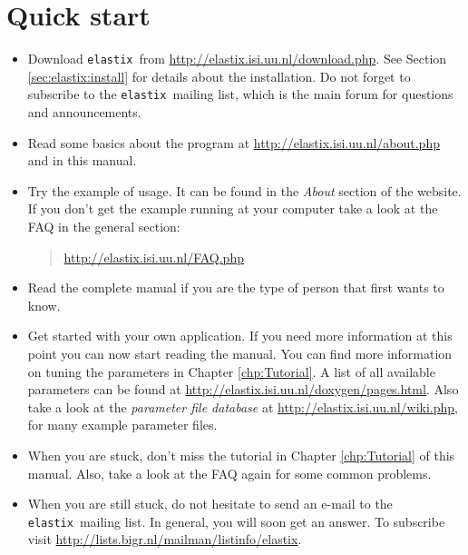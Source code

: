 \documentclass[]{report}
\newcommand{\elastix}{\texttt{elastix}}
\begin{document}

\section{Quick start}

\begin{itemize}
\item Download \elastix\ from \url{http://elastix.isi.uu.nl/download.php}.
    See Section \ref{sec:elastix:install} for details about the
    installation. Do not forget to subscribe to the \elastix\ mailing list,
    which is the main forum for questions and announcements.

\item Read some basics about the program at
    \url{http://elastix.isi.uu.nl/about.php} and in this manual.

\item Try the example of usage. It can be found in the \emph{About}
section of the website. If you don't get the example running at your
computer take a look at the FAQ in the general section:
\begin{quote}
\url{http://elastix.isi.uu.nl/FAQ.php}
\end{quote}

\item Read the complete manual if you are the type of person that
first wants to know.

\item Get started with your own application. If you need more information
    at this point you can now start reading the manual. You can find more
    information on tuning the parameters in Chapter \ref{chp:Tutorial}. A
    list of all available parameters can be found at
    \url{http://elastix.isi.uu.nl/doxygen/pages.html}. Also take a look at
    the \emph{parameter file database} at
    \url{http://elastix.isi.uu.nl/wiki.php}, for many example parameter
    files.

\item When you are stuck, don't miss the tutorial in Chapter
\ref{chp:Tutorial} of this manual. Also, take a look at the FAQ again
for some common problems.

\item When you are still stuck, do not hesitate to send an e-mail to the
    \elastix\ mailing list. In general, you will soon get an answer.
    To subscribe visit
    \url{http://lists.bigr.nl/mailman/listinfo/elastix}.
\end{itemize}
\end{document}
